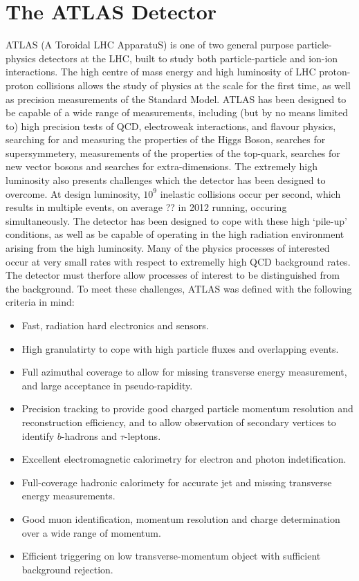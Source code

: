 \section{The ATLAS Detector}

ATLAS (A Toroidal LHC ApparatuS) is one of two general purpose particle-physics
detectors at the LHC, built to study both particle-particle and ion-ion
interactions. The high centre of mass energy and high luminosity of LHC proton-proton collisions
allows the study of physics at the \tev scale for the first time, as well as
precision measurements of the Standard Model. ATLAS has been designed to be
capable of a wide range of measurements, including (but by no means limited to)
high precision tests of QCD, electroweak interactions, and flavour physics, searching for and measuring
the properties of the Higgs Boson, searches for supersymmetery, measurements
of the properties of the top-quark, searches for new vector bosons and searches
for extra-dimensions. The extremely high luminosity also presents challenges which
the detector has been designed to overcome. At design luminosity, $10^9$
inelastic collisions occur per second, which results in multiple events, on average ?? in 2012 running, occuring
simultaneously. The detector has been designed to cope with these high
`pile-up' conditions, as well as be capable of operating in the high radiation
environment arising from the high luminosity. Many of the physics processes of interested occur at very
small rates with respect to extremelly high QCD background rates. The detector
must therfore allow processes of interest to be distinguished from the
background. To meet these challenges, ATLAS was defined with the following
criteria in mind:

\begin{itemize}
\item Fast, radiation hard electronics and sensors.
\item High granulatirty to  cope with high particle fluxes and overlapping events.
\item Full azimuthal coverage to allow for missing transverse energy
measurement, and large acceptance in pseudo-rapidity.
\item Precision tracking to provide good charged particle momentum resolution
and reconstruction efficiency, and to allow observation of secondary vertices to
identify $b$-hadrons and $\tau$-leptons.
\item Excellent electromagnetic calorimetry for electron and photon
indetification.
\item Full-coverage hadronic calorimety for accurate jet and missing transverse
energy measurements.
\item Good muon identification, momentum resolution and charge determination over a wide range of
momentum.
\item Efficient triggering on low transverse-momentum object with sufficient
background rejection.
\end{itemize}

